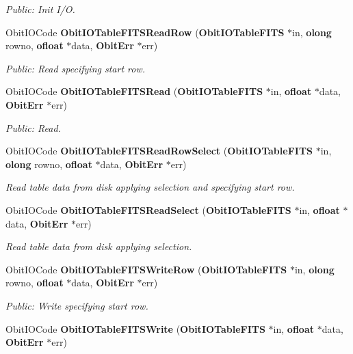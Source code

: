 \begin{CompactItemize}
\begin{CompactList}\small\item\em Public: Init I/O. \item\end{CompactList}\item 
Obit\-IOCode {\bf Obit\-IOTable\-FITSRead\-Row} ({\bf Obit\-IOTable\-FITS} $\ast$in, {\bf olong} rowno, {\bf ofloat} $\ast$data, {\bf Obit\-Err} $\ast$err)
\begin{CompactList}\small\item\em Public: Read specifying start row. \item\end{CompactList}\item 
Obit\-IOCode {\bf Obit\-IOTable\-FITSRead} ({\bf Obit\-IOTable\-FITS} $\ast$in, {\bf ofloat} $\ast$data, {\bf Obit\-Err} $\ast$err)
\begin{CompactList}\small\item\em Public: Read. \item\end{CompactList}\item 
Obit\-IOCode {\bf Obit\-IOTable\-FITSRead\-Row\-Select} ({\bf Obit\-IOTable\-FITS} $\ast$in, {\bf olong} rowno, {\bf ofloat} $\ast$data, {\bf Obit\-Err} $\ast$err)
\begin{CompactList}\small\item\em Read table data from disk applying selection and specifying start row. \item\end{CompactList}\item 
Obit\-IOCode {\bf Obit\-IOTable\-FITSRead\-Select} ({\bf Obit\-IOTable\-FITS} $\ast$in, {\bf ofloat} $\ast$data, {\bf Obit\-Err} $\ast$err)
\begin{CompactList}\small\item\em Read table data from disk applying selection. \item\end{CompactList}\item 
Obit\-IOCode {\bf Obit\-IOTable\-FITSWrite\-Row} ({\bf Obit\-IOTable\-FITS} $\ast$in, {\bf olong} rowno, {\bf ofloat} $\ast$data, {\bf Obit\-Err} $\ast$err)
\begin{CompactList}\small\item\em Public: Write specifying start row. \item\end{CompactList}\item 
Obit\-IOCode {\bf Obit\-IOTable\-FITSWrite} ({\bf Obit\-IOTable\-FITS} $\ast$in, {\bf ofloat} $\ast$data, {\bf Obit\-Err} $\ast$err)

\end{CompactItemize}
